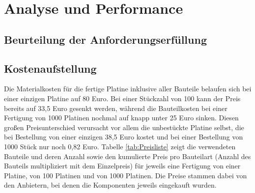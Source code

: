 \chapter{Analyse und Performance}\label{kap7}

\section{Beurteilung der Anforderungserfüllung}

\section{Kostenaufstellung}
Die Materialkosten für die fertige Platine inklusive aller Bauteile belaufen sich bei einer einzigen Platine auf 80 Euro. Bei einer Stückzahl von 100 kann der Preis bereits auf 33,5 Euro gesenkt werden, während die Bauteilkosten bei einer Fertigung von 1000 Platinen nochmal auf knapp unter 25 Euro sinken. Diesen großen Preisunterschied verursacht vor allem die unbestückte Platine selbst, die bei Bestellung von einer einzigen 38,5 Euro kostet und bei einer Bestellung von 1000 Stück nur noch 0,82 Euro. Tabelle \ref{tab:Preisliste} zeigt die verwendeten Bauteile und deren Anzahl sowie den kumulierte Preis pro Bauteilart (Anzahl des Bauteils multipliziert mit dem Einzelpreis) für jeweils eine Fertigung von einer Platine, von 100 Platinen und von 1000 Platinen. Die Preise stammen dabei von den Anbietern, bei denen die Komponenten jeweils eingekauft wurden.


